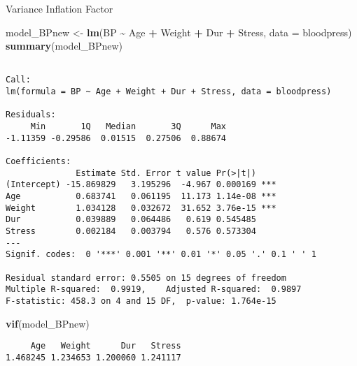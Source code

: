 \documentclass[
  ignorenonframetext,
]{beamer}
\newenvironment{Shaded}{\begin{snugshade}}{\end{snugshade}}
\newcommand{\AttributeTok}[1]{\textcolor[rgb]{0.13,0.29,0.53}{#1}}
\newcommand{\FunctionTok}[1]{\textcolor[rgb]{0.13,0.29,0.53}{\textbf{#1}}}
\newcommand{\NormalTok}[1]{#1}
\newcommand{\OtherTok}[1]{\textcolor[rgb]{0.56,0.35,0.01}{#1}}
\newcommand{\SpecialCharTok}[1]{\textcolor[rgb]{0.81,0.36,0.00}{\textbf{#1}}}
\begin{document}
\begin{frame}[fragile]{Variance Inflation Factor}
\protect\hypertarget{variance-inflation-factor-3}{}
\tiny

\begin{Shaded}
\begin{Highlighting}[]
\NormalTok{model\_BPnew }\OtherTok{\textless{}{-}} \FunctionTok{lm}\NormalTok{(BP }\SpecialCharTok{\textasciitilde{}}\NormalTok{ Age }\SpecialCharTok{+}\NormalTok{ Weight }\SpecialCharTok{+}\NormalTok{ Dur }\SpecialCharTok{+}\NormalTok{ Stress, }\AttributeTok{data =}\NormalTok{ bloodpress)}
\FunctionTok{summary}\NormalTok{(model\_BPnew)}
\end{Highlighting}
\end{Shaded}

\begin{verbatim}

Call:
lm(formula = BP ~ Age + Weight + Dur + Stress, data = bloodpress)

Residuals:
     Min       1Q   Median       3Q      Max 
-1.11359 -0.29586  0.01515  0.27506  0.88674 

Coefficients:
              Estimate Std. Error t value Pr(>|t|)    
(Intercept) -15.869829   3.195296  -4.967 0.000169 ***
Age           0.683741   0.061195  11.173 1.14e-08 ***
Weight        1.034128   0.032672  31.652 3.76e-15 ***
Dur           0.039889   0.064486   0.619 0.545485    
Stress        0.002184   0.003794   0.576 0.573304    
---
Signif. codes:  0 '***' 0.001 '**' 0.01 '*' 0.05 '.' 0.1 ' ' 1

Residual standard error: 0.5505 on 15 degrees of freedom
Multiple R-squared:  0.9919,    Adjusted R-squared:  0.9897 
F-statistic: 458.3 on 4 and 15 DF,  p-value: 1.764e-15
\end{verbatim}

\begin{Shaded}
\begin{Highlighting}[]
\FunctionTok{vif}\NormalTok{(model\_BPnew)}
\end{Highlighting}
\end{Shaded}

\begin{verbatim}
     Age   Weight      Dur   Stress 
1.468245 1.234653 1.200060 1.241117 
\end{verbatim}

\normalsize
\end{frame}
\end{document}
